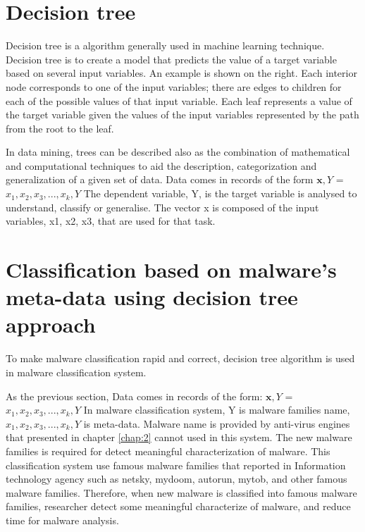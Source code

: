 \section{Decision tree\cite{wikipedia}}
Decision tree is a algorithm generally used in machine learning technique. Decision tree is to create a model that predicts the value of a target variable based on several input variables. An example is shown on the right. Each interior node corresponds to one of the input variables; there are edges to children for each of the possible values of that input variable. Each leaf represents a value of the target variable given the values of the input variables represented by the path from the root to the leaf.

In data mining, trees can be described also as the combination of mathematical and computational techniques to aid the description, categorization and generalization of a given set of data.
Data comes in records of the form
\(\textbf{x},Y\) = \(x_1, x_2, x_3, ..., x_k, Y\)
The dependent variable, Y, is the target variable is analysed to understand, classify or generalise. The vector x is composed of the input variables, x1, x2, x3, that are used for that task.
\section{Classification based on malware's meta-data using decision tree approach}
To make malware classification rapid and correct, decision tree algorithm is used in malware classification system.

As the previous section, Data comes in records of the form:
\(\textbf{x},Y\) = \(x_1, x_2, x_3, ..., x_k, Y\)
In malware classification system, Y is malware families name, \(x_1, x_2, x_3, ..., x_k, Y\) is meta-data. Malware name is provided by anti-virus engines that presented in chapter \ref{chap:2} cannot used in this system. The new malware families is required for detect meaningful characterization of malware. This classification system use famous malware families that reported in Information technology agency such as netsky, mydoom, autorun, mytob, and other famous malware families. Therefore, when new malware is classified into famous malware families, researcher detect some meaningful characterize of malware, and reduce time for malware analysis. 

